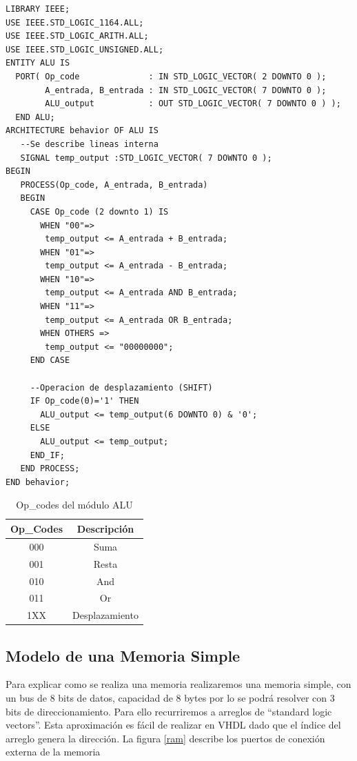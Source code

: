 \begin{lstlisting}[style=vhdl, basicstyle=\footnotesize\ttfamily]
LIBRARY IEEE;
USE IEEE.STD_LOGIC_1164.ALL;
USE IEEE.STD_LOGIC_ARITH.ALL;
USE IEEE.STD_LOGIC_UNSIGNED.ALL;
ENTITY ALU IS
  PORT( Op_code              : IN STD_LOGIC_VECTOR( 2 DOWNTO 0 );
        A_entrada, B_entrada : IN STD_LOGIC_VECTOR( 7 DOWNTO 0 );
        ALU_output           : OUT STD_LOGIC_VECTOR( 7 DOWNTO 0 ) );
  END ALU;
ARCHITECTURE behavior OF ALU IS
   --Se describe lineas interna
   SIGNAL temp_output :STD_LOGIC_VECTOR( 7 DOWNTO 0 );
BEGIN
   PROCESS(Op_code, A_entrada, B_entrada)
   BEGIN
     CASE Op_code (2 downto 1) IS 
       WHEN "00"=>
        temp_output <= A_entrada + B_entrada;
       WHEN "01"=>
        temp_output <= A_entrada - B_entrada;
       WHEN "10"=>
        temp_output <= A_entrada AND B_entrada;
       WHEN "11"=>
        temp_output <= A_entrada OR B_entrada;
       WHEN OTHERS =>
        temp_output <= "00000000";
     END CASE

     --Operacion de desplazamiento (SHIFT)
     IF Op_code(0)='1' THEN 
       ALU_output <= temp_output(6 DOWNTO 0) & '0';
     ELSE 
       ALU_output <= temp_output;
     END_IF;
   END PROCESS;
END behavior;
\end{lstlisting}
\begin{table}[!hbt] 
\centering
 \begin{tabular}{|c|c|}
\hline
\textbf{Op\_Codes} & \textbf{Descripción} \\ \hline
000 & Suma \\ \hline
001 & Resta \\ \hline
010 & And \\ \hline
011 & Or \\ \hline
1XX & Desplazamiento \\ \hline
\end{tabular}
  \caption{Op\_codes del módulo ALU}
  \label{aluopcodes}
\end{table}  

\subsection{Modelo de una Memoria Simple}
Para explicar como se realiza una memoria realizaremos una memoria simple, con un
bus de 8 bits de datos, capacidad de 8 bytes por lo se podrá resolver con 3 bits de direccionamiento.
Para ello recurriremos a arreglos de ``standard logic vectors''. 
Esta aproximación es fácil de realizar en VHDL dado que el índice del arreglo genera 
la dirección. 
La figura \ref{ram} describe los puertos de conexión externa de la memoria

